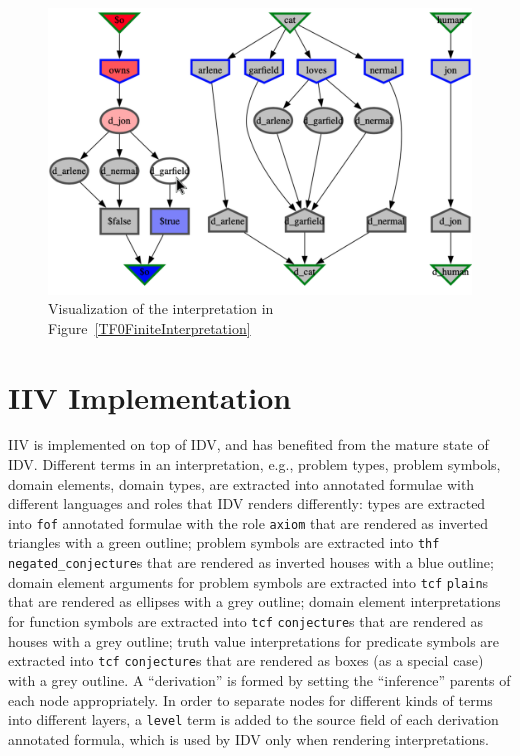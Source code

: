 \documentclass[letterpaper]{article}
\newcommand{\smalltt}[1]{\small \texttt{#1}}
\begin{document}
{\begin{figure}[htbp]
\centering
\includegraphics[width=\columnwidth]{IIVGraph.pdf}
\caption{Visualization of the interpretation in Figure~\ref{TF0FiniteInterpretation}}
\label{TF0FiniteIIV}
\end{figure}

\section{IIV Implementation}
\label{Implementation}

IIV is implemented on top of IDV, and has benefited from the mature state of IDV.
Different terms in an interpretation, e.g., problem types, problem symbols, domain elements,
domain types, are extracted into annotated formulae with different languages and roles that
IDV renders differently: 
types are extracted into {\smalltt{fof}} annotated formulae with the role {\smalltt{axiom}}
that are rendered as inverted triangles with a green outline;
problem symbols are extracted into {\smalltt{thf}} {\smalltt{negated\_conjecture}}s
that are rendered as inverted houses with a blue outline;
domain element arguments for problem symbols are extracted into {\smalltt{tcf}} {\smalltt{plain}}s
that are rendered as ellipses with a grey outline;
domain element interpretations for function symbols are extracted into {\smalltt{tcf}}
{\smalltt{conjecture}}s that are rendered as houses with a grey outline;
truth value interpretations for predicate symbols are extracted into {\smalltt{tcf}}
{\smalltt{conjecture}}s that are rendered as boxes (as a special case) with a grey outline.
A ``derivation'' is formed by setting the ``inference'' parents of each node appropriately.
In order to separate nodes for different kinds of terms into different layers, a {\smalltt{level}}
term is added to the source field of each derivation annotated formula, which is used by IDV only
when rendering interpretations.

}
\end{document}
